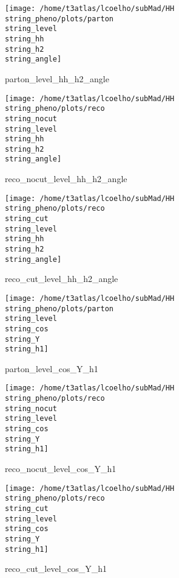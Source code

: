 \documentclass[a4paper,onecolumn,final,11pt]{article}
\begin{document}
\begin{figure}[H] 
\centering 
\begin{minipage}{.32\textwidth} 
        \centering 
        \hspace{0cm} 
        \texttt{[image: /home/t3atlas/lcoelho/subMad/HH\\string\_pheno/plots/parton\\string\_level\\string\_hh\\string\_h2\\string\_angle]} 
        \caption{parton_level_hh_h2_angle} 
\end{minipage} 
\hfill 
\begin{minipage}{.32\textwidth} 
        \centering 
        \hspace{0cm} 
    \texttt{[image: /home/t3atlas/lcoelho/subMad/HH\\string\_pheno/plots/reco\\string\_nocut\\string\_level\\string\_hh\\string\_h2\\string\_angle]} 
        \caption{reco_nocut_level_hh_h2_angle} 
\end{minipage} 
\hfill 
\begin{minipage}{.32\textwidth} 
        \centering 
        \hspace{0cm} 
    \texttt{[image: /home/t3atlas/lcoelho/subMad/HH\\string\_pheno/plots/reco\\string\_cut\\string\_level\\string\_hh\\string\_h2\\string\_angle]} 
        \caption{reco_cut_level_hh_h2_angle} 
\end{minipage} 
\end{figure} 
 
\begin{figure}[H] 
\centering 
\begin{minipage}{.32\textwidth} 
        \centering 
        \hspace{0cm} 
        \texttt{[image: /home/t3atlas/lcoelho/subMad/HH\\string\_pheno/plots/parton\\string\_level\\string\_cos\\string\_Y\\string\_h1]} 
        \caption{parton_level_cos_Y_h1} 
\end{minipage} 
\hfill 
\begin{minipage}{.32\textwidth} 
        \centering 
        \hspace{0cm} 
    \texttt{[image: /home/t3atlas/lcoelho/subMad/HH\\string\_pheno/plots/reco\\string\_nocut\\string\_level\\string\_cos\\string\_Y\\string\_h1]} 
        \caption{reco_nocut_level_cos_Y_h1} 
\end{minipage} 
\hfill 
\begin{minipage}{.32\textwidth} 
        \centering 
        \hspace{0cm} 
    \texttt{[image: /home/t3atlas/lcoelho/subMad/HH\\string\_pheno/plots/reco\\string\_cut\\string\_level\\string\_cos\\string\_Y\\string\_h1]} 
        \caption{reco_cut_level_cos_Y_h1} 
\end{minipage} 
\end{figure} 
 
\end{document}
